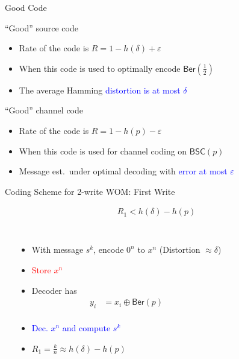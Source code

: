 \documentclass[10pt]{beamer}
\def\WOM_path{../compound-codes/WOM/slides/Figures}
\begin{document}
\begin{frame}{Good Code}
  \begin{block}{``Good'' source code}
    \begin{itemize}
    \item Rate of the code is $R=1-h(\delta)+\varepsilon$
    \item When this code is used to \alert{optimally encode} $\mathsf{Ber}(\tfrac{1}{2})$
    \item The average Hamming \textcolor{blue}{distortion is at most $\delta$}
    \end{itemize}
  \end{block}
  \vspace{0.4cm}
  \begin{block}{``Good'' channel code}
    \begin{itemize}
    \item Rate of the code is $R=1-h(p)-\varepsilon$
    \item When this code is used for channel coding on $\mathsf{BSC}(p)$
    \item Message est.~under \alert{optimal decoding} with \textcolor{blue}{error at most $\varepsilon$}
    \end{itemize}
  \end{block}
\end{frame}

\begin{frame}{Coding Scheme for 2-write WOM: First Write}
  \vspace{-2cm}
  \begin{center}
    \begin{align*}
      R_1 < h(\delta) - h(p)
    \end{align*}
  \end{center}
  \vspace{-0.5cm}
  \begin{columns}
    \begin{center}
      \scalebox{0.5}{}
    \end{center}

    \begin{itemize}
    \item<1-> With message $s^k$, encode $0^n$ to $x^n$ (Distortion $\approx \delta$)
    \item<1-> \textcolor{red}{Store $x^n$}
    \item<2-> Decoder has
      \small{
        \begin{align*}
          y_i&=x_i \oplus \mathsf{Ber}(p) \\
        \end{align*}
      }
    \vspace{-1.25cm}
    \item <3-> \textcolor{blue}{Dec. $x^n$ and compute $s^k$}
    \item <3-> $R_1=\tfrac{k}{n}\approx h(\delta)-h(p)$
    \end{itemize}
  \end{columns}
\end{frame}
\end{document}

